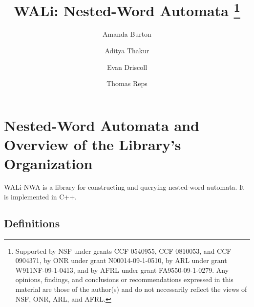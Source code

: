\documentclass{llncs}
\begin{document}
\pagestyle{plain}
\title{WALi: Nested-Word Automata
\thanks{Supported
by NSF under grants CCF-0540955, CCF-0810053, and CCF-0904371,
by ONR under grant N00014-09-1-0510,
by ARL under grant W911NF-09-1-0413,
and by AFRL under grant FA9550-09-1-0279.
Any opinions, findings, and conclusions or recommendations expressed
in this material are those of the author(s) and do not necessarily
reflect the views of NSF, ONR, ARL, and AFRL.
} 
}

\author{Amanda Burton \and Aditya Thakur \and Evan Driscoll \and Thomas Reps}
\date{}
\maketitle


\newcommand{\TODO}[1]{\mbox{\bf [TODO #1]}}

\section{Nested-Word Automata and Overview of the Library's Organization}
\label{Se:Nested Word Automata}

WALi-NWA is a library for constructing and querying nested-word automata.  It
is implemented in C++.

\subsection{Definitions}
\label{Se:Def}
\end{document}

